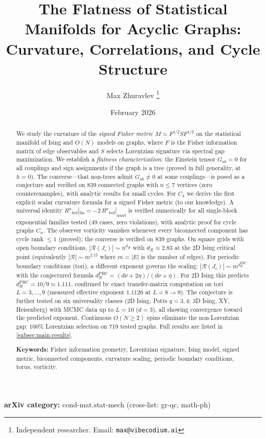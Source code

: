 \documentclass[11pt]{article}
\title{The Flatness of Statistical Manifolds for Acyclic Graphs:\\
Curvature, Correlations, and Cycle Structure}
\author{Max Zhuravlev%
\thanks{Independent researcher. Email: \texttt{max@vibecodium.ai}}}
\date{February 2026}
\theoremstyle{definition}
\theoremstyle{remark}
\newcommand{\Fish}{F}
\newcommand{\sgn}{S}
\newcommand{\Met}{M}
\newcommand{\Ein}{G}
\newcommand{\Ric}{R}
\newcommand{\Scal}{\mathcal{R}}
\begin{document}

\maketitle

\noindent\textbf{arXiv category:} cond-mat.stat-mech (cross-list: gr-qc, math-ph)

\begin{abstract}
We study the curvature of the \emph{signed Fisher metric}
$\Met = \Fish^{1/2} \sgn \Fish^{1/2}$ on the statistical manifold of
Ising and $O(N)$ models on graphs, where $\Fish$ is the Fisher
information matrix of edge observables and $\sgn$ selects Lorentzian
signature via spectral gap maximization.
We establish a \emph{flatness characterization}: the Einstein
tensor $\Ein_{ab} = 0$ for all couplings and sign assignments if the graph
is a tree (proved in full generality, at $h = 0$). The converse---that
non-trees admit $\Ein_{ab} \neq 0$ at some couplings---is posed as a
conjecture and verified on 839 connected graphs with $n \leq 7$ vertices
(zero counterexamples), with analytic results for small cycles.
For $C_4$ we derive the first explicit scalar curvature formula for a
signed Fisher metric (to our knowledge).
A universal identity
$\Ric^a{}_{bcd}|_{\mathrm{lin}} = -2\,\Ric^a{}_{bcd}|_{\mathrm{quad}}$
is verified numerically for all single-block exponential families tested
(49 cases, zero violations), with analytic proof for cycle graphs $C_n$.
The observer vorticity vanishes whenever every biconnected component has
cycle rank $\leq 1$ (proved); the converse is verified on 839 graphs.
On square grids with open boundary conditions, $|\Scal(J_c)| \sim n^{d_{\Scal}}$ with
$d_{\Scal} \approx 2.83$ at the 2D Ising critical point (equivalently
$|\Scal| \sim m^{2.15}$ where $m = |E|$ is the number of edges).
For periodic boundary conditions (tori), a different exponent governs the
scaling: $|\Scal(J_c)| \sim m^{d_R^{\mathrm{PBC}}}$ with the conjectured
formula $d_R^{\mathrm{PBC}} = (d\nu + 2\eta)/(d\nu + \eta)$.
For 2D Ising this predicts $d_R^{\mathrm{PBC}} = 10/9 \approx 1.111$, confirmed
by exact transfer-matrix computation on tori $L = 3, \ldots, 9$
(measured effective exponent $1.1126$ at $L = 8{\to}9$).
The conjecture is further tested on six universality classes
(2D Ising, Potts $q = 3, 4$; 3D Ising, XY, Heisenberg) with
MCMC data up to $L = 10$ ($d = 3$), all showing convergence
toward the predicted exponent.
Continuous $O(N \geq 2)$ spins eliminate the non-Lorentzian gap:
$100\%$ Lorentzian selection on 719 tested graphs.
Full results are listed in \cref{subsec:main-results}.

\medskip
\noindent\textbf{Keywords:} Fisher information geometry, Lorentzian
signature, Ising model, signed metric,
biconnected components, curvature scaling, periodic boundary conditions,
torus, vorticity.
\end{abstract}
\end{document}
